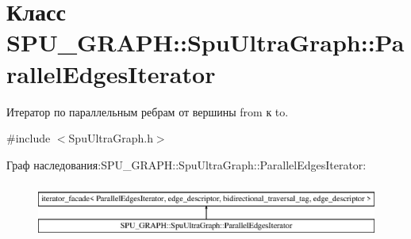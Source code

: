 \hypertarget{class_s_p_u___g_r_a_p_h_1_1_spu_ultra_graph_1_1_parallel_edges_iterator}{}\section{Класс S\+P\+U\+\_\+\+G\+R\+A\+PH\+:\+:Spu\+Ultra\+Graph\+:\+:Parallel\+Edges\+Iterator}
\label{class_s_p_u___g_r_a_p_h_1_1_spu_ultra_graph_1_1_parallel_edges_iterator}


Итератор по параллельным ребрам от вершины from к to.  




{\ttfamily \#include $<$Spu\+Ultra\+Graph.\+h$>$}

Граф наследования\+:S\+P\+U\+\_\+\+G\+R\+A\+PH\+:\+:Spu\+Ultra\+Graph\+:\+:Parallel\+Edges\+Iterator\+:\begin{figure}[H]
\begin{center}
\leavevmode
\includegraphics[height=1.839080cm]{class_s_p_u___g_r_a_p_h_1_1_spu_ultra_graph_1_1_parallel_edges_iterator}
\end{center}
\end{figure}
